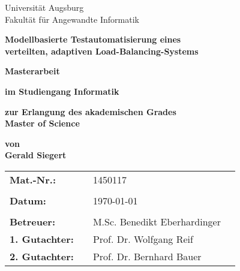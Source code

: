 \begin{center}
    {\Large{Universität Augsburg\\Fakultät für Angewandte Informatik}}
    \vspace{4\baselineskip}
    
    \begin{onehalfspace}
        \textbf{\large{Modellbasierte Testautomatisierung eines\\verteilten, adaptiven Load-Balancing-Systems}}
    \end{onehalfspace}
    \vspace{3\baselineskip}
    
    \textbf{{\Large{Masterarbeit}}}
    \vspace{1\baselineskip}
    
    \textbf{im Studiengang Informatik}
    \vspace{1\baselineskip}
    
    \textbf{zur Erlangung des akademischen Grades\\Master of Science}
    \vspace{1\baselineskip}
    
    \textbf{von\\Gerald Siegert}
    \vspace{\fill}
    
    \begin{singlespace}
        \begin{tabular}{llll}
        	\textbf{Mat.-Nr.:}     &  & 1450117                      &  \\
        	                       &  &                              &  \\
        	\textbf{Datum:}        &  & \today                       &  \\
        	                       &  &                              &  \\
        	\textbf{Betreuer:}     &  & M.Sc. Benedikt Eberhardinger &  \\
        	\textbf{1. Gutachter:} &  & Prof. Dr. Wolfgang Reif      &  \\
        	\textbf{2. Gutachter:} &  & Prof. Dr. Bernhard Bauer     &
        \end{tabular}
    \end{singlespace}
\end{center}

